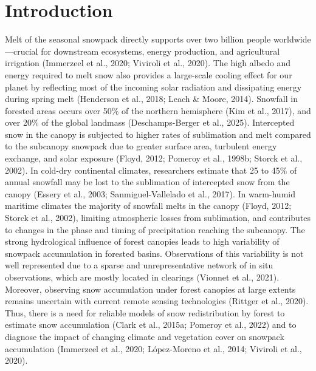 \documentclass[
  letterpaper,
]{tex/uofsthesis-cs}
\begin{document}

% 	


%  	



\chapter{Introduction}\label{introduction}

Melt of the seasonal snowpack directly supports over two billion people
worldwide---crucial for downstream ecosystems, energy production, and
agricultural irrigation (Immerzeel et al., 2020; Viviroli et al., 2020).
The high albedo and energy required to melt snow also provides a
large-scale cooling effect for our planet by reflecting most of the
incoming solar radiation and dissipating energy during spring melt
(Henderson et al., 2018; Leach \& Moore, 2014). Snowfall in forested
areas occurs over 50\% of the northern hemisphere (Kim et al., 2017),
and over 20\% of the global landmass (Deschamps-Berger et al., 2025).
Intercepted snow in the canopy is subjected to higher rates of
sublimation and melt compared to the subcanopy snowpack due to greater
surface area, turbulent energy exchange, and solar exposure (Floyd,
2012; Pomeroy et al., 1998b; Storck et al., 2002). In cold-dry
continental climates, researchers estimate that 25 to 45\% of annual
snowfall may be lost to the sublimation of intercepted snow from the
canopy (Essery et al., 2003; Sanmiguel-Vallelado et al., 2017). In
warm-humid maritime climates the majority of snowfall melts in the
canopy (Floyd, 2012; Storck et al., 2002), limiting atmospheric losses
from sublimation, and contributes to changes in the phase and timing of
precipitation reaching the subcanopy. The strong hydrological influence
of forest canopies leads to high variability of snowpack accumulation in
forested basins. Observations of this variability is not well
represented due to a sparse and unrepresentative network of in situ
observations, which are mostly located in clearings (Vionnet et al.,
2021). Moreover, observing snow accumulation under forest canopies at
large extents remains uncertain with current remote sensing technologies
(Rittger et al., 2020). Thus, there is a need for reliable models of
snow redistribution by forest to estimate snow accumulation (Clark et
al., 2015a; Pomeroy et al., 2022) and to diagnose the impact of changing
climate and vegetation cover on snowpack accumulation (Immerzeel et al.,
2020; López-Moreno et al., 2014; Viviroli et al., 2020).
\end{document}
